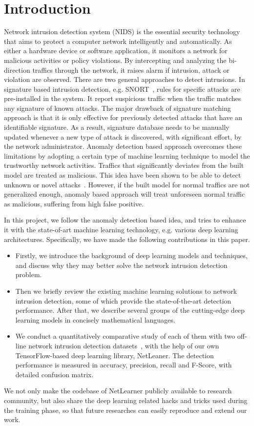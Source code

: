 \section{Introduction}

Network intrusion detection system (NIDS) is the essential security technology that
aims to protect a computer network intelligently and automatically.
As either a hardware device or software application,
it monitors a network for malicious activities or policy violations.
By intercepting and analyzing the bi-direction traffics through the network,
it raises alarm if intrusion, attack or violation are observed.
There are two general approaches to detect intrusions.
In signature based intrusion detection, e.g. SNORT~\cite{Snort},
rules for specific attacks are pre-installed in the system.
It report suspicious traffic when the traffic matches any signature of known attacks.
The major drawback of signature matching approach is that
it is only effective for previously detected attacks that have an identifiable signature.
As a result, signature database needs to be manually updated whenever a new type of attack
is discovered, with significant effort, by the network administrator.
Anomaly detection based approach overcomes these limitations by adopting a certain
type of machine learning technique to model the trustworthy network activities.
Traffics that significantly deviates from the built model are treated as malicious.
This idea have been shown to be able to detect unknown or novel attacks~\cite{NSL-KDD, STL-NIDS}.
However, if the built model for normal traffics are not generalized enough,
anomaly based approach will treat unforeseen normal traffic as malicious,
suffering from high false positive.

In this project, we follow the anomaly detection based idea, and tries to enhance it with the
state-of-art machine learning technology, e.g. various deep learning architectures.
Specifically, we have made the following contributions in this paper.
\begin{itemize}
    \item Firstly, we introduce the background of deep learning models and techniques,
        and discuss why they may better solve the network intrusion detection problem.
    \item Then we briefly review the existing machine learning solutions to network intrusion detection,
        some of which provide the state-of-the-art detection performance.
        After that, we describe several groups of the cutting-edge deep learning models
        in concisely mathematical languages.
    \item We conduct a quantitatively comparative study of each of them with two off-line network intrusion detection datasets~\cite{NSL-KDD, UNSW},
        with the help of our own TensorFlow-based deep learning library, NetLeaner.
        The detection performance is measured in accuracy, precision, recall and F-Score,
        with detailed confusion matrix.
\end{itemize}

We not only make the codebase of NetLearner publicly available to research community,
but also share the deep learning related hacks and tricks used during the training phase,
so that future researches can easily reproduce and extend our work.
